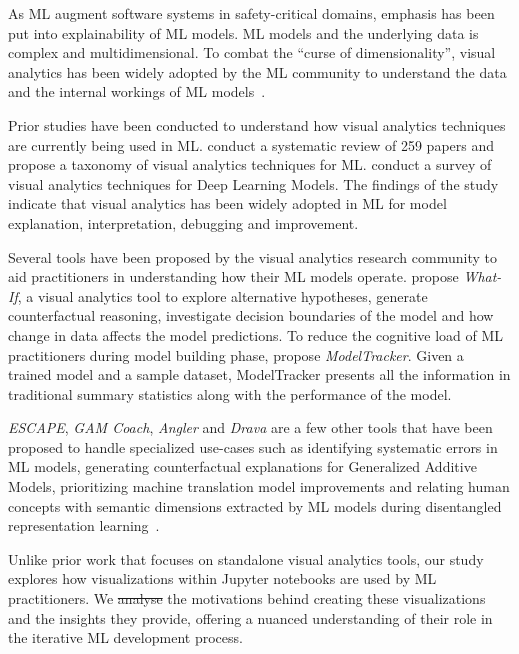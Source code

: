 \documentclass[smallextended]{svjour3}       %
\providecommand{\DIFadd}[1]{{\protect\color{blue}\uwave{#1}}} %
\providecommand{\DIFdel}[1]{{\protect\color{red}\sout{#1}}} %
\providecommand{\DIFaddbegin}{} %
\providecommand{\DIFaddend}{} %
\providecommand{\DIFdelbegin}{} %
\providecommand{\DIFdelend}{} %
\newcommand{\DIFscaledelfig}{0.5}
\newlength{\DIFdelgraphicswidth} %
\newlength{\DIFdelgraphicsheight} %
\newcommand{\DIFaddincludegraphics}[2][]{{\color{blue}\fbox{\DIFOincludegraphics[#1]{#2}}}} %
\newcommand{\DIFdelincludegraphics}[2][]{%
\sbox{\DIFdelgraphicsbox}{\DIFOincludegraphics[#1]{#2}}%
\settoboxwidth{\DIFdelgraphicswidth}{\DIFdelgraphicsbox} %
\settoboxtotalheight{\DIFdelgraphicsheight}{\DIFdelgraphicsbox} %
\scalebox{\DIFscaledelfig}{%
\parbox[b]{\DIFdelgraphicswidth}{\usebox{\DIFdelgraphicsbox}\\[-\baselineskip] \rule{\DIFdelgraphicswidth}{0em}}\llap{\resizebox{\DIFdelgraphicswidth}{\DIFdelgraphicsheight}{%
\setlength{\unitlength}{\DIFdelgraphicswidth}%
\begin{picture}(1,1)%
\thicklines\linethickness{2pt} %
{\color[rgb]{1,0,0}\put(0,0){\framebox(1,1){}}}%
{\color[rgb]{1,0,0}\put(0,0){\line( 1,1){1}}}%
{\color[rgb]{1,0,0}\put(0,1){\line(1,-1){1}}}%
\end{picture}%
}\hspace*{3pt}}} %
} %
\DeclareRobustCommand{\DIFaddbegin}{\DIFOaddbegin \let\includegraphics\DIFaddincludegraphics} %
\DeclareRobustCommand{\DIFaddend}{\DIFOaddend \let\includegraphics\DIFOincludegraphics} %
\DeclareRobustCommand{\DIFdelbegin}{\DIFOdelbegin \let\includegraphics\DIFdelincludegraphics} %
\DeclareRobustCommand{\DIFdelend}{\DIFOaddend \let\includegraphics\DIFOincludegraphics} %
\begin{document}
As ML augment software systems in safety-critical domains, emphasis has been put into explainability of ML models. ML models and the underlying data is complex and multidimensional. To combat the ``curse of dimensionality'', visual analytics has been widely adopted by the ML community to understand the data and the internal workings of ML models~\citep{yuan2021survey,hohman2019visual,wexler2019what-if}.

Prior studies have been conducted to understand how visual analytics techniques are currently being used in ML. \citet{yuan2021survey} conduct a systematic review of 259 papers and propose a taxonomy of visual analytics techniques for ML. \citet{hohman2019visual} conduct a survey of visual analytics techniques for Deep Learning Models. The findings of the study indicate that visual analytics has been widely adopted in ML for model explanation, interpretation, debugging and improvement.

Several tools have been proposed by the visual analytics research community to aid practitioners in understanding how their ML models operate. \citet{wexler2019what-if} propose \textit{What-If}, a visual analytics tool to explore alternative hypotheses, generate counterfactual reasoning, investigate decision boundaries of the model and how change in data affects the model predictions. To reduce the cognitive load of ML practitioners during model building phase, \citet{amershi2019software} propose \textit{ModelTracker}. Given a trained model and a sample dataset, ModelTracker presents all the information in traditional summary statistics along with the performance of the model.

\textit{ESCAPE}, \textit{GAM Coach}, \textit{Angler} and \textit{Drava} are a few other tools that have been proposed to handle specialized use-cases such as identifying systematic errors in ML models, generating counterfactual explanations for Generalized Additive Models, prioritizing machine translation model improvements and relating human concepts with semantic dimensions extracted by ML models during disentangled representation learning~\citep{ahn2023escape,wang2023gam,robertson2023angler,wang2023drava}.

Unlike prior work that focuses on standalone visual analytics tools, our study explores how visualizations within Jupyter notebooks are used by ML practitioners. We \DIFdelbegin \DIFdel{analyse }\DIFdelend \DIFaddbegin \DIFadd{analyze }\DIFaddend the motivations behind creating these visualizations and the insights they provide, offering a nuanced understanding of their role in the iterative ML development process.
\end{document}

